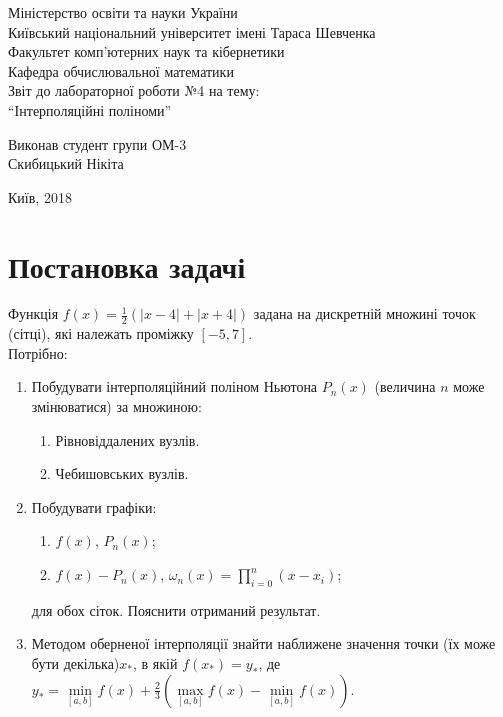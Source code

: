 \documentclass[12pt, a4paper]{article}
\theoremstyle{definition}
\newcommand{\Min}{\displaystyle\min\limits}
\newcommand{\Max}{\displaystyle\max\limits}
\newcommand{\Prod}{\displaystyle\prod\limits}
\numberwithin{equation}{section}
\begin{document}
\setlength\parindent{0pt}
\allowdisplaybreaks

\begin{center}
\hfill \break
Міністерство освіти та науки України \\
Київський національний університет імені Тараса Шевченка \\ 
Факультет комп'ютерних наук та кібернетики \\
Кафедра обчислювальної математики \\
\vfill 
\large{Звіт до лабораторної роботи №4 на тему: \\ ``Інтерполяційні поліноми''} \\
\vfill 
\end{center}
\begin{flushright}
Виконав студент групи ОМ-3 \\
Скибицький Нікіта
\end{flushright}
\vfill 
\begin{center}
    Київ, 2018 
\end{center}
\thispagestyle{empty}
 
\newpage

\section{Постановка задачі}

Функція $f(x) = \frac12(|x-4|+|x+4|)$ задана на дискретній множині точок (сітці), які належать проміжку $[-5,7]$. \\

Потрібно:
\begin{enumerate}
	\item Побудувати інтерполяційний поліном Ньютона $P_n (x)$ (величина $n$ може змінюватися) за множиною:
	\begin{enumerate}
		\item Рівновіддалених вузлів.
		\item Чебишовських вузлів.
	\end{enumerate}
	\item Побудувати графіки:
	\begin{enumerate}
		\item $f(x)$, $P_n(x)$;
		\item $f(x)-P_n (x)$, $\omega_n (x)= \Prod_{i=0}^n (x-x_i)$;
	\end{enumerate}
	для обох сіток. Пояснити отриманий результат.
	\item Методом оберненої інтерполяції знайти наближене значення точки (їх може бути декілька)$x_*$, в якій $f(x_*)=y_*$, де $y_*=\Min_{[a,b]}f(x)+\frac23\left(\Max_{[a,b]}f(x)-\Min_{[a,b]}f(x)\right)$.
\end{enumerate}
\end{document}
